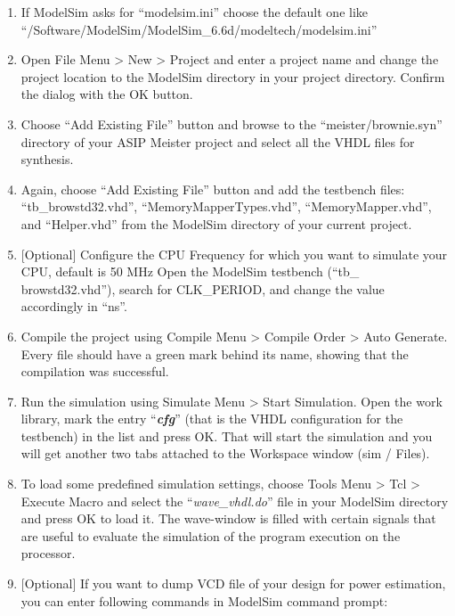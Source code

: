 \documentclass[
]{article}
\begin{document}
\begin{enumerate}
\def\labelenumi{\arabic{enumi}.}
\setcounter{enumi}{9}
\item
  If ModelSim asks for ``modelsim.ini'' choose the default one like
  ``/Software/ModelSim/ModelSim\_6.6d/modeltech/modelsim.ini''
\item
  Open File Menu \textgreater{} New \textgreater{} Project and enter a
  project name and change the project location to the ModelSim directory
  in your project directory. Confirm the dialog with the OK button.
\item
  Choose ``Add Existing File'' button and browse to the
  ``meister/brownie.syn'' directory of your ASIP Meister project and
  select all the VHDL files for synthesis.
\item
  Again, choose ``Add Existing File'' button and add the testbench
  files: ``tb\_browstd32.vhd'', ``MemoryMapperTypes.vhd'',
  ``MemoryMapper.vhd'', and ``Helper.vhd'' from the ModelSim directory
  of your current project.
\item
  {[}Optional{]} Configure the CPU Frequency for which you want to
  simulate your CPU, default is 50 MHz Open the ModelSim testbench
  (``tb\_ browstd32.vhd''), search for CLK\_PERIOD, and change the value
  accordingly in ``ns''.
\item
  Compile the project using Compile Menu \textgreater{} Compile Order
  \textgreater{} Auto Generate. Every file should have a green mark
  behind its name, showing that the compilation was successful.
\item
  Run the simulation using Simulate Menu \textgreater{} Start
  Simulation. Open the work library, mark the entry
  ``\emph{\textbf{cfg}}'' (that is the VHDL configuration for the
  testbench) in the list and press OK. That will start the simulation
  and you will get another two tabs attached to the Workspace window
  (sim / Files).
\item
  To load some predefined simulation settings, choose Tools Menu
  \textgreater{} Tcl \textgreater{} Execute Macro and select the
  ``\emph{wave\_vhdl.do}'' file in your ModelSim directory and press OK
  to load it. The wave-window is filled with certain signals that are
  useful to evaluate the simulation of the program execution on the
  processor.
\item
  {[}Optional{]} If you want to dump VCD file of your design for power
  estimation, you can enter following commands in ModelSim command
  prompt:
\end{enumerate}
\end{document}

